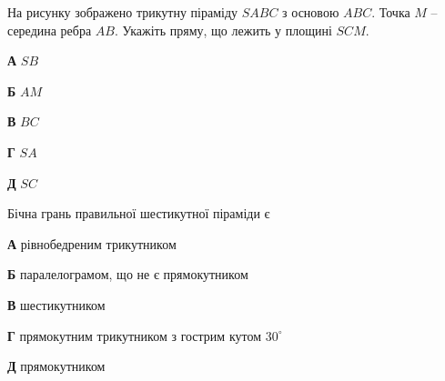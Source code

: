 \documentclass[12pt]{article}
\begin{document}
\begin{samepage}
\noindent\zadnum \begin{minipage}[t]{0.52\textwidth}
На рисунку зображено трикутну піраміду $SABC$ з основою $ABC$. Точка $M$ – середина ребра $AB$. Укажіть пряму, що лежить у площині $SCM$. 

\nopagebreak\nbvspace{0.3cm}
\textbf{А} \quad $SB$

\textbf{Б} \quad $AM$

\textbf{В} \quad $BC$

\textbf{Г} \quad $SA$

\textbf{Д} \quad $SC$
\end{minipage}
\hfill
\begin{minipage}[t]{0.40\textwidth}
\nopagebreak\nbvspace{-0.3cm}
\begin{center}
\begin{nmtfit}\end{nmtfit}
\end{center}
\end{minipage}

\nmtnobreak
\nopagebreak\nbvspace{0.5cm}
\par{}\vspace{0.25cm}
\end{samepage}

\begin{samepage}
\noindent\zadnum Бічна грань правильної шестикутної піраміди є 

\nmtnobreak
\nopagebreak\nbvspace{0.3cm}
\noindent
\textbf{А} \quad рівнобедреним трикутником

\nmtnobreak
\noindent
\textbf{Б} \quad паралелограмом, що не є прямокутником

\nmtnobreak
\noindent
\textbf{В} \quad шестикутником

\nmtnobreak
\noindent
\textbf{Г} \quad прямокутним трикутником з гострим кутом $30^\circ$

\nmtnobreak
\noindent
\textbf{Д} \quad прямокутником

\nmtnobreak
\nopagebreak\nbvspace{0.5cm}
\par{}\vspace{0.25cm}
\end{samepage}
\end{document}
